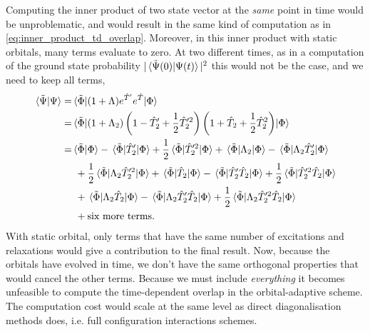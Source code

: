     Computing the inner product of two state vector at the \emph{same} point in 
    time would be unproblematic, and would result in the same kind of 
    computation as in \autoref{eq:inner_product_td_overlap}. Moreover, in this 
    inner product with static orbitals, many terms evaluate to zero. At two different 
    times, as in a computation of the ground state probability
    $|\braket*{\tilde{\Psi}(0)}{\Psi(t)}|^2$ this would not be the case, and we need 
    to keep all terms,
    \begin{equation}
        \begin{aligned}
        \braket*{\tilde{\Psi}}{\Psi}
            =& \mel*{\tilde{\Phi}}{(1 + \Lambda) e^{\hat{T}'}e^{\hat{T}}}{\Phi} \\
            =& \mel*{\tilde{\Phi}}
            {
               \left(1 + \Lambda_2\right)
               \left(1 - \hat{T}'_2 + \frac{1}{2}\hat{T}'^2_2\right) 
               \left(1 + \hat{T}_2 + \frac{1}{2}\hat{T}^2_2\right)
            }
            {\Phi} \\
            =& \braket*{\tilde{\Phi}}{\Phi} - \mel*{\tilde{\Phi}}{\hat{T}'_2}{\Phi} 
                + \frac{1}{2}\mel*{\tilde{\Phi}}{\hat{T}'^2_2}{\Phi}
                + \mel*{\tilde{\Phi}}{\Lambda_2}{\Phi}
                - \mel*{\tilde{\Phi}}{\Lambda_2\hat{T}'_2}{\Phi} \\
            &\ + \frac{1}{2} \mel*{\tilde{\Phi}}{\Lambda_2\hat{T}'^2_2}{\Phi}
                + \mel*{\tilde{\Phi}}{\hat{T}_2}{\Phi}
                - \mel*{\tilde{\Phi}}{\hat{T}'_2\hat{T}_2}{\Phi}
                + \frac{1}{2}\mel*{\tilde{\Phi}}{\hat{T}'^2_2\hat{T}_2}{\Phi} \\
            &\  + \mel*{\tilde{\Phi}}{\Lambda_2\hat{T}_2}{\Phi}
                - \mel*{\tilde{\Phi}}{\Lambda_2\hat{T}'_2\hat{T}_2}{\Phi}
                + \frac{1}{2}\mel*{\tilde{\Phi}}{\Lambda_2\hat{T}'^2_2\hat{T}_2}{\Phi} \\
            &\ + \text{six more terms}.
        \end{aligned}
    \end{equation}
    With static orbital, only terms that have the same number of excitations and relaxations would 
    give a contribution to the final result. Now, because the orbitals have evolved in time, 
    we don't have the same orthogonal properties that would cancel the other terms. Because we must 
    include \emph{everything} it becomes unfeasible to compute the time-dependent overlap in the 
    orbital-adaptive scheme. The computation cost would scale at the same level as direct diagonalisation 
    methods does, i.e. full configuration interactions schemes.

